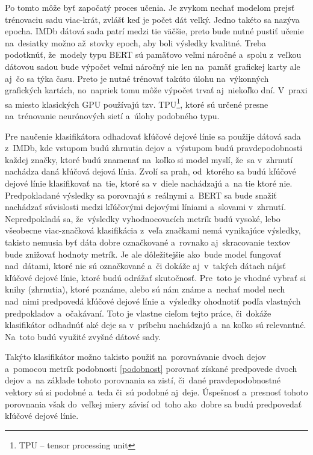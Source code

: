 Po tomto môže byť započatý proces učenia. Je zvykom nechať modelom prejsť trénovaciu sadu viac-krát, zvlášť keď je počet dát veľký. Jedno takéto  sa nazýva epocha. IMDb dátová sada patrí medzi tie väčšie, preto bude nutné pustiť učenie na~desiatky možno až~stovky epoch, aby boli výsledky kvalitné. Treba podotknúť, že~modely typu BERT sú pamäťovo veľmi náročné a~spolu z~veľkou dátovou sadou bude výpočet veľmi náročný nie len na~pamäť grafickej karty ale aj~čo sa týka času. Preto je nutné trénovať takúto úlohu na~výkonných grafických kartách, no~napriek tomu môže výpočet trvať aj~niekoľko dní. V~praxi sa miesto klasických GPU používajú tzv. TPU\footnote{TPU -- tensor processing unit}, ktoré sú určené presne na~trénovanie neurónových sietí a~úlohy podobného typu. 

Pre naučenie klasifikátora odhadovať kľúčové dejové línie sa použije dátová sada z~IMDb, kde vstupom budú zhrnutia dejov a~výstupom budú pravdepodobnosti každej značky, ktoré budú znamenať na~koľko si model myslí, že~sa v~zhrnutí nachádza daná kľúčová dejová línia. Zvolí sa prah, od~ktorého sa budú kľúčové dejové línie klasifikovať na~tie, ktoré sa v~diele nachádzajú a~na tie ktoré nie. Predpokladané výsledky sa porovnajú s~reálnymi a~BERT sa bude snažiť nachádzať súvislosti medzi kľúčovými dejovými líniami a~slovami v~zhrnutí. Nepredpokladá sa, že~výsledky vyhodnocovacích metrík budú vysoké, lebo všeobecne viac-značková klasifikácia z~veľa značkami nemá vynikajúce výsledky, takisto nemusia byť dáta dobre označkované a~rovnako aj~skracovanie textov bude znižovať hodnoty metrík. Je ale dôležitejšie ako~bude model fungovať nad~dátami, ktoré nie sú označkované a~či dokáže aj~v~takých dátach nájsť kľúčové dejové línie, ktoré budú odrážať skutočnosť. Pre~toto je vhodné vybrať si knihy (zhrnutia), ktoré poznáme, alebo sú nám známe a~nechať model nech nad~nimi predpovedá kľúčové dejové línie a~výsledky ohodnotiť podľa vlastných predpokladov a~očakávaní. Toto je vlastne cieľom tejto práce, či~dokáže klasifikátor odhadnúť aké deje sa v~príbehu nachádzajú a~na koľko sú relevantné. Na~toto budú využité zvyšné dátové sady.

Takýto klasifikátor možno takisto použiť na~porovnávanie dvoch dejov a~pomocou metrík podobnosti \ref{podobnost} porovnať získané predpovede dvoch dejov a~na základe tohoto porovnania sa zistí, či~dané pravdepodobnostné vektory sú si podobné a~teda či~sú podobné aj~deje. Úspešnosť a~presnosť tohoto porovnania však do~veľkej miery závisí od~toho ako~dobre sa budú predpovedať kľúčové dejové línie.

